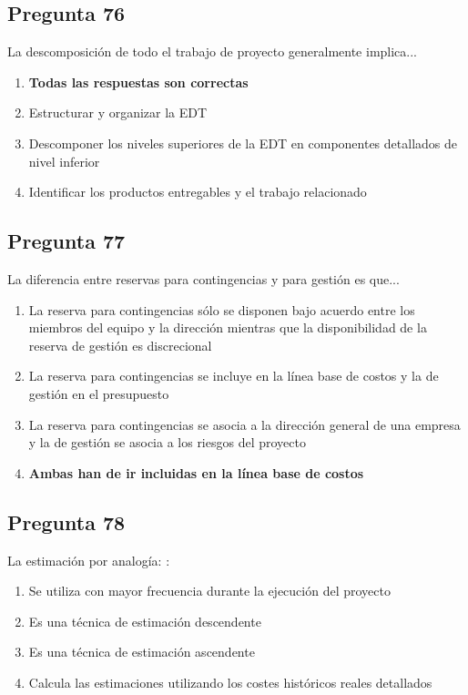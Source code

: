\documentclass[11pt,a4paper]{article}
\begin{document}
\subsection*{Pregunta 76}
La descomposición de todo el trabajo de proyecto generalmente implica...

\begin{enumerate}[label=\alph*)]
  \item \textbf{Todas las respuestas son correctas}
  \item Estructurar y organizar la EDT
  \item Descomponer los niveles superiores de la EDT en componentes detallados de nivel inferior
  \item Identificar los productos entregables y el trabajo relacionado
\end{enumerate}

\subsection*{Pregunta 77}
La diferencia entre reservas para contingencias y para gestión es que...

\begin{enumerate}[label=\alph*)]
  \item La reserva para contingencias sólo se disponen bajo acuerdo entre los miembros del equipo y la dirección mientras que la disponibilidad de la reserva de gestión es discrecional
  \item La reserva para contingencias se incluye en la línea base de costos y la de gestión en el presupuesto
  \item La reserva para contingencias se asocia a la dirección general de una empresa y la de gestión se asocia a los riesgos del proyecto
  \item \textbf{Ambas han de ir incluidas en la línea base de costos}
\end{enumerate}

\subsection*{Pregunta 78}
La estimación por analogía: :

\begin{enumerate}[label=\alph*)]
  \item Se utiliza con mayor frecuencia durante la ejecución del proyecto
  \item Es una técnica de estimación descendente
  \item Es una técnica de estimación ascendente
  \item Calcula las estimaciones utilizando los costes históricos reales detallados
\end{enumerate}
\end{document}
